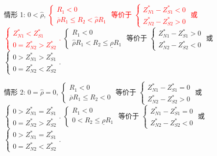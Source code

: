 \documentclass[10.0pt]{article}
\newcommand{\hhred}{\textcolor{red}}
\begin{document}
情形 1: $ 0 < {\hat \rho} $, \hhred{$ \left\{ \begin{matrix} R_1 < 0 \\ \overline{\rho} R_1 \leqslant R_2 < {\hat \rho} R_1 \end{matrix} \right. $ 等价于 $ \left\{ \begin{matrix} Z_{N 1}^* - Z_{S 1}^* < 0 \\ Z_{N 2}^* - Z_{S 2}^* > 0 \end{matrix} \right. $ 或 $ \left\{ \begin{matrix} Z_{N 1}^* < Z_{S 1}^* \\ 0 = Z_{N 2}^* > Z_{S 2}^* \end{matrix} \right. $.}
$ \left\{ \begin{matrix} R_1 < 0 \\ {\hat \rho} R_1 < R_2 \leqslant \underline{\rho} R_1 \end{matrix} \right. $ 等价于 $ \left\{ \begin{matrix} Z_{N 1}^* - Z_{S 1}^* > 0 \\ Z_{N 2}^* - Z_{S 2}^* < 0 \end{matrix} \right. $ 或 $ \left\{ \begin{matrix} 0 > Z_{N 1}^* > Z_{S 1}^* \\ 0 = Z_{N 2}^* < Z_{S 2}^* \end{matrix} \right. $.

情形 2: $ 0 = {\hat \rho} = 0 $, $ \left\{ \begin{matrix} R_1 < 0 \\ \overline{\rho} R_1 \leqslant R_2 < 0 \end{matrix} \right. $ 等价于 $ \left\{ \begin{matrix} Z_{N 1}^* - Z_{S 1}^* = 0 \\ Z_{N 2}^* - Z_{S 2}^* > 0 \end{matrix} \right. $ 或 $ \left\{ \begin{matrix} 0 > Z_{N 1}^* = Z_{S 1}^* \\ 0 = Z_{N 2}^* > Z_{S 2}^* \end{matrix} \right. $.
$ \left\{ \begin{matrix} R_1 < 0 \\ 0 < R_2 \leqslant \underline{\rho} R_1 \end{matrix} \right. $ 等价于 $ \left\{ \begin{matrix} Z_{N 1}^* - Z_{S 1}^* = 0 \\ Z_{N 2}^* - Z_{S 2}^* < 0 \end{matrix} \right. $ 或 $ \left\{ \begin{matrix} 0 > Z_{N 1}^* = Z_{S 1}^* \\ 0 = Z_{N 2}^* < Z_{S 2}^* \end{matrix} \right. $.
\end{document}
